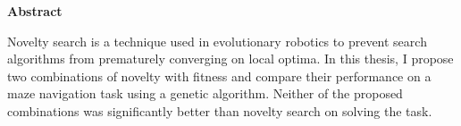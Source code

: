 
\vspace*{3cm}

\begin{center}
	\textbf{Abstract}
\end{center}

{
	Novelty search is a technique used in evolutionary robotics to prevent search
	algorithms from prematurely converging on local optima.
	In this thesis, I propose two combinations of novelty with fitness and
	compare their performance on a maze navigation task using a genetic algorithm.
	Neither of the proposed combinations was significantly better than novelty search on
	solving the task.
}

\thispagestyle{empty}
\newpage